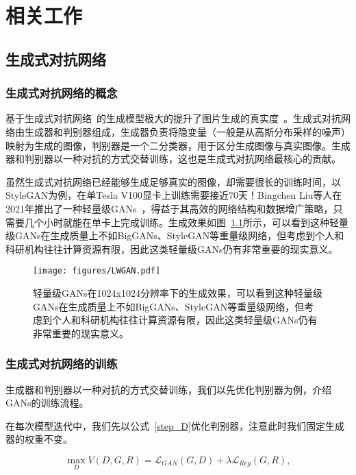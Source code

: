 \chapter{相关工作}

\section{生成式对抗网络}

\subsection{生成式对抗网络的概念}

基于生成式对抗网络~\cite{GANs}的生成模型极大的提升了图片生成的真实度~\cite{BigGANs,StyleGAN}。生成式对抗网络由生成器和判别器组成，生成器负责将隐变量（一般是从高斯分布采样的噪声）映射为生成的图像，判别器是一个二分类器，用于区分生成图像与真实图像。生成器和判别器以一种对抗的方式交替训练，这也是生成式对抗网络最核心的贡献。

虽然生成式对抗网络已经能够生成足够真实的图像，却需要很长的训练时间，以StyleGAN为例，在单Tesla V100显卡上训练需要接近70天！Bingchen Liu等人在2021年推出了一种轻量级GANs~\cite{lwgan}，得益于其高效的网络结构和数据增广策略，只需要几个小时就能在单卡上完成训练。生成效果如图~\ref{fig:LWGAN}所示，可以看到这种轻量级GANs在生成质量上不如BigGANs、StyleGAN等重量级网络，但考虑到个人和科研机构往往计算资源有限，因此这类轻量级GANs仍有非常重要的现实意义。

\begin{figure}
    \centering
    \texttt{[image: figures/LWGAN.pdf]}
    \caption{轻量级GANs在1024x1024分辨率下的生成效果，可以看到这种轻量级GANs在生成质量上不如BigGANs、StyleGAN等重量级网络，但考虑到个人和科研机构往往计算资源有限，因此这类轻量级GANs仍有非常重要的现实意义。}
    \label{fig:LWGAN}
\end{figure}

\subsection{生成式对抗网络的训练}

生成器和判别器以一种对抗的方式交替训练，我们以先优化判别器为例，介绍GANs的训练流程。

在每次模型迭代中，我们先以公式~\ref{step_D}优化判别器，注意此时我们固定生成器的权重不变。

\begin{equation}
    \max _{D} V(D, G, R) = \mathcal{L}_{GAN}(G, D) + \lambda \mathcal{L}_{Reg}(G, R),
    \label{step_D}
\end{equation}

